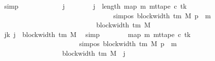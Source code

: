 \begin{isabellebody}
\ simp\isanewline
\ \ \ \ \isamarkupfalse%
\isanewline
\ \ \ \ \ \ \isamarkupfalse%
\ j\isanewline
\ \ \ \ \ \ \isamarkupfalse%
\ {\isachardoublequoteopen}j\ {\isacharless}{\kern0pt}\ length\ {\isacharparenleft}{\kern0pt}map\ {\isacharparenleft}{\kern0pt}{\isasymlambda}m{\isachardot}{\kern0pt}\ mt{\isacharunderscore}{\kern0pt}tape\ c{\isacharprime}{\kern0pt}\ tk\isanewline
\ \ \ \ \ \ \ \ \ \ \ \ \ \ \ \ \ \ \ \ \ \ \ \ \ \ \ \ \ \ \ \ \ {\isacharparenleft}{\kern0pt}sim{\isacharunderscore}{\kern0pt}pos\ {\isacharparenleft}{\kern0pt}block{\isacharunderscore}{\kern0pt}width\ {\isacharparenleft}{\kern0pt}{\isasymGamma}{\isacharunderscore}{\kern0pt}tm\ M{\isacharparenright}{\kern0pt}{\isacharparenright}{\kern0pt}\ p\ {\isacharplus}{\kern0pt}\ m{\isacharparenright}{\kern0pt}{\isacharparenright}{\kern0pt}\isanewline
\ \ \ \ \ \ \ \ \ \ \ \ \ \ \ \ \ \ \ \ \ \ \ \ \ \ \ \ {\isacharbrackleft}{\kern0pt}{}{\isachardot}{\kern0pt}{\isachardot}{\kern0pt}{\isacharless}{\kern0pt}block{\isacharunderscore}{\kern0pt}width\ {\isacharparenleft}{\kern0pt}{\isasymGamma}{\isacharunderscore}{\kern0pt}tm\ M{\isacharparenright}{\kern0pt}{\isacharbrackright}{\kern0pt}{\isacharparenright}{\kern0pt}{\isachardoublequoteclose}\isanewline
\ \ \ \ \ \ \isamarkupfalse%
\ jk{\isacharcolon}{\kern0pt}\ {\isachardoublequoteopen}j\ {\isacharless}{\kern0pt}\ block{\isacharunderscore}{\kern0pt}width\ {\isacharparenleft}{\kern0pt}{\isasymGamma}{\isacharunderscore}{\kern0pt}tm\ M{\isacharparenright}{\kern0pt}{\isachardoublequoteclose}\ \isamarkupfalse%
\ simp\isanewline
\ \ \ \ \ \ \isamarkupfalse%
\ {\isachardoublequoteopen}map\ {\isacharparenleft}{\kern0pt}{\isasymlambda}m{\isachardot}{\kern0pt}\ mt{\isacharunderscore}{\kern0pt}tape\ c{\isacharprime}{\kern0pt}\ tk\isanewline
\ \ \ \ \ \ \ \ \ \ \ \ \ \ \ \ \ \ \ \ \ \ \ {\isacharparenleft}{\kern0pt}sim{\isacharunderscore}{\kern0pt}pos\ {\isacharparenleft}{\kern0pt}block{\isacharunderscore}{\kern0pt}width\ {\isacharparenleft}{\kern0pt}{\isasymGamma}{\isacharunderscore}{\kern0pt}tm\ M{\isacharparenright}{\kern0pt}{\isacharparenright}{\kern0pt}\ p\ {\isacharplus}{\kern0pt}\ m{\isacharparenright}{\kern0pt}{\isacharparenright}{\kern0pt}\isanewline
\ \ \ \ \ \ \ \ \ \ \ \ \ \ \ \ \ \ {\isacharbrackleft}{\kern0pt}{}{\isachardot}{\kern0pt}{\isachardot}{\kern0pt}{\isacharless}{\kern0pt}block{\isacharunderscore}{\kern0pt}width\ {\isacharparenleft}{\kern0pt}{\isasymGamma}{\isacharunderscore}{\kern0pt}tm\ M{\isacharparenright}{\kern0pt}{\isacharbrackright}{\kern0pt}\ {\isacharbang}{\kern0pt}\ j\isanewline

\end{isabellebody}
